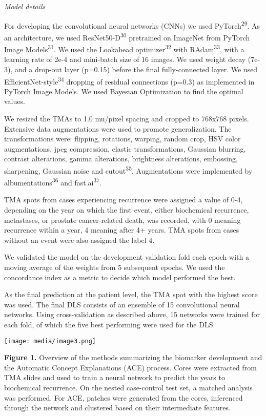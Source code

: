 \documentclass[
  12pt,
  a5,margin=2cmpaper,
]{article}
\begin{document}
\emph{Model details}

For developing the convolutional neural networks (CNNs) we used
PyTorch\textsuperscript{29}. As an architecture, we used
ResNet50-D\textsuperscript{30} pretrained on ImageNet from PyTorch Image
Models\textsuperscript{31}. We used the Lookahead
optimizer\textsuperscript{32} with RAdam\textsuperscript{33}, with a
learning rate of 2e-4 and mini-batch size of 16 images. We used weight
decay (7e-3), and a drop-out layer (p=0.15) before the final
fully-connected layer. We used EfficientNet-style\textsuperscript{34}
dropping of residual connections (p=0.3) as implemented in PyTorch Image
Models. We used Bayesian Optimization to find the optimal values.

We resized the TMAs to 1.0 mu/pixel spacing and cropped to 768x768
pixels. Extensive data augmentations were used to promote
generalization. The transformations were: flipping, rotations, warping,
random crop, HSV color augmentations, jpeg compression, elastic
transformations, Gaussian blurring, contrast alterations, gamma
alterations, brightness alterations, embossing, sharpening, Gaussian
noise and cutout\textsuperscript{35}. Augmentations were implemented by
albumentations\textsuperscript{36} and fast.ai\textsuperscript{37}.

TMA spots from cases experiencing recurrence were assigned a value of
0-4, depending on the year on which the first event, either biochemical
recurrence, metastases, or prostate cancer-related death, was recorded,
with 0 meaning recurrence within a year, 4 meaning after 4+ years. TMA
spots from cases without an event were also assigned the label 4.

We validated the model on the development validation fold each epoch
with a moving average of the weights from 5 subsequent epochs. We used
the concordance index as a metric to decide which model performed the
best.

As the final prediction at the patient level, the TMA spot with the
highest score was used. The final DLS consists of an ensemble of 15
convolutional neural networks. Using cross-validation as described
above, 15 networks were trained for each fold, of which the five best
performing were used for the DLS.

\texttt{[image: media/image3.png]}

\textbf{Figure 1.} Overview of the methods summarizing the biomarker
development and the Automatic Concept Explanations (ACE) process. Cores
were extracted from TMA slides and used to train a neural network to
predict the years to biochemical recurrence. On the nested case-control
test set, a matched analysis was performed. For ACE, patches were
generated from the cores, inferenced through the network and clustered
based on their intermediate features.
\end{document}
